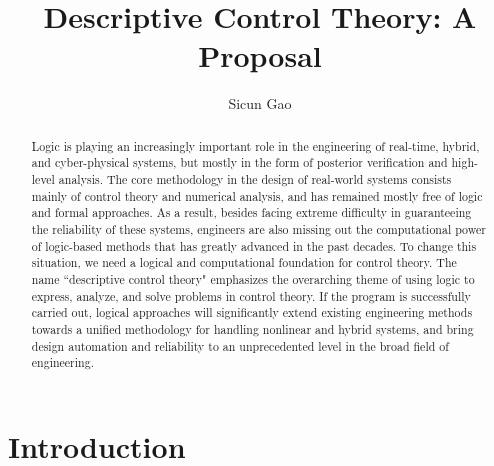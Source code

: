 \documentclass[11pt]{article}
\title{\bf Descriptive Control Theory: A Proposal}
\author{Sicun Gao}
\date{}
\theoremstyle{definition}
\begin{document}
\maketitle
\thispagestyle{empty}
\begin{abstract}
Logic is playing an increasingly important role in the engineering of real-time, hybrid, and cyber-physical systems, but mostly in the form of posterior verification and high-level analysis. The core methodology in the design of real-world systems consists mainly of control theory and numerical analysis, and has remained mostly free of logic and formal approaches. As a result, besides facing extreme difficulty in guaranteeing the reliability of these systems, engineers are also missing out the computational power of logic-based methods that has greatly advanced in the past decades. To change this situation, we need a logical and computational foundation for control theory. The name ``descriptive control theory" emphasizes the overarching theme of using logic to express, analyze, and solve problems in control theory. If the program is successfully carried out, logical approaches will significantly extend existing engineering methods towards a unified methodology for handling nonlinear and hybrid systems, and bring design automation and reliability to an unprecedented level in the broad field of engineering. 
\end{abstract}

\vspace{.6cm}

\section{Introduction}
\end{document}
